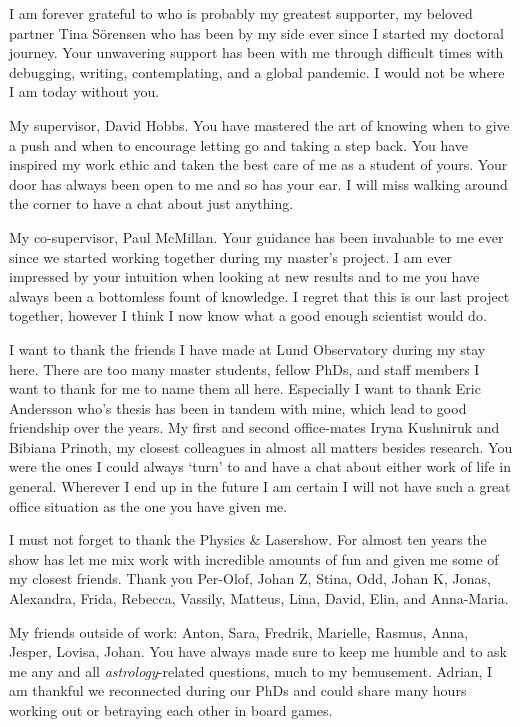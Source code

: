 I am forever grateful to who is probably my greatest supporter, my beloved partner Tina Sörensen who has been by my side ever since I started my doctoral journey. Your unwavering support has been with me through difficult times with debugging, writing, contemplating, and a global pandemic. I would not be where I am today without you. 

My supervisor, David Hobbs. You have mastered the art of knowing when to give a push and when to encourage letting go and taking a step back. You have inspired my work ethic and taken the best care of me as a student of yours. Your door has always been open to me and so has your ear. I will miss walking around the corner to have a chat about just anything.

My co-supervisor, Paul McMillan. Your guidance has been invaluable to me ever since we started working together during my master's project. I am ever impressed by your intuition when looking at new results and to me you have always been a bottomless fount of knowledge. I regret that this is our last project together, however I think I now know what a good enough scientist would do. 

I want to thank the friends I have made at Lund Observatory during my stay here. There are too many master students, fellow PhDs, and staff members I want to thank for me to name them all here. Especially I want to thank Eric Andersson who's thesis has been in tandem with mine, which lead to good friendship over the years. My first and second office-mates Iryna Kushniruk and Bibiana Prinoth, my closest colleagues in almost all matters besides research. You were the ones I could always `turn' to and have a chat about either work of life in general. Wherever I end up in the future I am certain I will not have such a great office situation as the one you have given me. 

I must not forget to thank the Physics \& Lasershow. For almost ten years the show has let me mix work with incredible amounts of fun and given me some of my closest friends. Thank you Per-Olof, Johan Z, Stina, Odd, Johan K, Jonas, Alexandra, Frida, Rebecca, Vassily, Matteus, Lina, David, Elin, and Anna-Maria.  

My friends outside of work: Anton, Sara, Fredrik, Marielle, Rasmus, Anna, Jesper, Lovisa, Johan. You have always made sure to keep me humble and to ask me any and all \textit{astrology}-related questions, much to my bemusement. Adrian, I am thankful we reconnected during our PhDs and could share many hours working out or betraying each other in board games.


